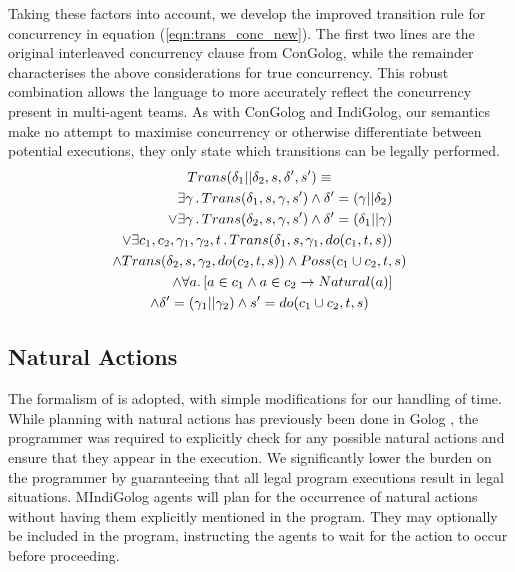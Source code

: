 Taking these factors into account, we develop the improved transition
rule for concurrency in equation (\ref{eqn:trans_conc_new}). The
first two lines are the original interleaved concurrency clause from
ConGolog, while the remainder characterises the above considerations
for true concurrency. This robust combination allows the language
to more accurately reflect the concurrency present in multi-agent
teams. As with ConGolog and IndiGolog, our semantics make no attempt
to maximise concurrency or otherwise differentiate between potential
executions, they only state which transitions can be legally performed.\begin{multline}
Trans(\delta_{1}||\delta_{2},s,\delta',s')\equiv\\
\shoveright{\exists\gamma\,.\, Trans(\delta_{1},s,\gamma,s')\wedge\delta'=(\gamma||\delta_{2})}\\
\shoveright{\vee\exists\gamma\,.\, Trans(\delta_{2},s,\gamma,s')\wedge\delta'=(\delta_{1}||\gamma)}\\
\shoveright{\vee\exists c_{1},c_{2},\gamma_{1},\gamma_{2},t\,.\, Trans(\delta_{1},s,\gamma_{1},do(c_{1},t,s))}\\
\wedge Trans(\delta_{2},s,\gamma_{2},do(c_{2},t,s))\wedge Poss(c_{1}\cup c_{2},t,s)\\
\shoveright{\wedge\forall a.\left[a\in c_{1}\wedge a\in c_{2}\rightarrow Natural(a)\right]}\\
\wedge\delta'=(\gamma_{1}||\gamma_{2})\wedge s'=do(c_{1}\cup c_{2},t,s)\label{eqn:trans_conc_new}\end{multline}



\subsection{Natural Actions}

The formalism of \citet{reiter96sc_nat_conc} is adopted, with simple
modifications for our handling of time. While planning with natural
actions has previously been done in Golog \citet{pirri00planning_nat_acts},
the programmer was required to explicitly check for any possible natural
actions and ensure that they appear in the execution. We significantly
lower the burden on the programmer by guaranteeing that all legal
program executions result in legal situations. MIndiGolog agents will
plan for the occurrence of natural actions without having them explicitly
mentioned in the program. They may optionally be included in the program,
instructing the agents to wait for the action to occur before proceeding.

